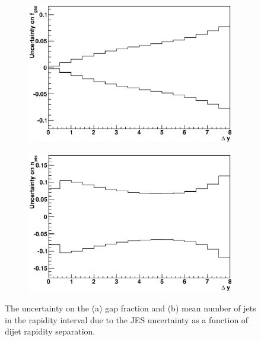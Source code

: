 \begin{figure}
\centering
        \begin{subfigure}[b]{0.5\textwidth}
                \centering
                \includegraphics[width=\textwidth]{figures/GBJ2/JES/Smeared__GapFraction_deltaY.eps}
        \end{subfigure}%
        \begin{subfigure}[b]{0.5\textwidth}
                \centering
                \includegraphics[width=\textwidth]{figures/GBJ2/JES/Smeared__prof_deltaY_njets.eps}
        \end{subfigure}%
\caption[Uncertainty bands due to the JES uncertainty for gap fraction and mean number of jets]{
The uncertainty on the (a) gap fraction and (b) mean number of jets in the rapidity interval due to the JES uncertainty as a function of dijet rapidity separation. 
\label{GBJ2:JES:gap_njets}}
\end{figure}



